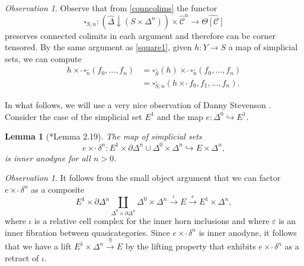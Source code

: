 \documentclass[leqno]{article}
\numberwithin{equation}{subsection}
\theoremstyle{plain}   %
\newtheorem{lemma}[equation]{Lemma}
\theoremstyle{remark}
\newtheorem{obs}[equation]{Observation}
\theoremstyle{plain}
\newcommand{\overcat}[2]{{\left(#1\downarrow #2\right)}}
\newcommand{\psh}[1]{\ensuremath{\widehat{#1}}}
\providecommand{\C}{}
\renewcommand{\C}{\ensuremath{\mathcal{C}}}
\newcommand{\cellset}{\ensuremath{\widehat{\Theta[\mathcal{C}]}}}
\begin{document}
\begin{obs}\label{joyalsquare1}
	Observe that from \ref{conncolims} the functor 
	\[\square_{S,n}:\overcat{\psh{\Delta}}{(S\times\Delta^n)} \times\psh{\C}^n \to \cellset\]
	preserves connected colimits in each argument and therefore can be corner tensored. By the same argument as \ref{square1}, given \(h:Y\to S\) a map of simplicial sets, we can compute 
	\begin{align*}
		 h \times^\lrcorner \square^\lrcorner_n(f_0,\dots,f_n)  &= \square_S^\lrcorner(h)\times^\lrcorner \square^\lrcorner_n(f_0,\dots,f_n)\\
		&= \square^\lrcorner_{S,n}(h\times^\lrcorner f_0,f_1,\dots,f_n).
	\end{align*}
\end{obs}

In what follows, we will use a very nice observation of Danny Stevenson \cite{danny}.  Consider the case of the simplicial set \(E^1\) and the map \(e:\Delta^0 \hookrightarrow E^1\).  
\begin{lemma}[\cite{danny}*{Lemma 2.19}]\label{dannythm}
	The map of simplicial sets
	\[e\times^\lrcorner \delta^n: E^1\times \partial\Delta^n \cup \Delta^0 \times \Delta^n \hookrightarrow E\times \Delta^n,\]
	is inner anodyne for all \(n>0\).  
\end{lemma}
\begin{obs}\label{retractjoyal}
	It follows from the small object argument that we can factor \(e\times^\lrcorner \delta^n\) as a composite
	\[
	E^1 \times \partial \Delta^n \coprod_{\Delta^0 \times \partial \Delta^n} \Delta^0 \times \Delta^n \xrightarrow{\iota} E \xrightarrow{\varepsilon} E^1 \times \Delta^n,
	\] 
	where \(\iota\) is a relative cell complex for the inner horn inclusions and where \(\varepsilon\) is an inner fibration between quasicategories. Since \(e\times^\lrcorner \delta^n\) is inner anodyne, it follows that we have a lift \(E^1\times \Delta^n \xrightarrow{\eta} E\) by the lifting property that exhibits \(e\times^\lrcorner \delta^n\) as a retract of \(\iota\).  
\end{obs}
\end{document}
